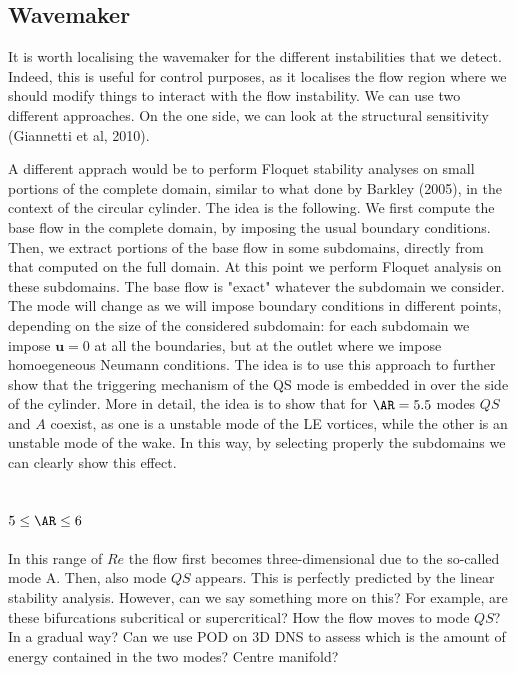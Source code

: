 \documentclass[onecolumn,notitlepage,superscriptaddress, amsmath,amssymb,longbibliographyaps,floatfix]{revtex4-1}
\begin{document}
\subsection{Wavemaker}

It is worth localising the wavemaker for the different instabilities that we detect. Indeed, this is useful for control purposes, as it localises the flow region where we should modify things to interact with the flow instability. We can use two different approaches. On the one side, we can look at the structural sensitivity (Giannetti et al, 2010). 

A different apprach would be to perform Floquet stability analyses on small portions of the complete domain, similar to what done by Barkley (2005), in the context of the circular cylinder. The idea is the following. We first compute the base flow in the complete domain, by imposing the usual boundary conditions. Then, we extract portions of the base flow in some subdomains, directly from that computed on the full domain. At this point we perform Floquet analysis on these subdomains. The base flow is "exact" whatever the subdomain we consider. The mode will change as we will impose boundary conditions in different points, depending on the size of the considered subdomain: for each subdomain we impose $\bm{u}=0$ at all the boundaries, but at the outlet where we impose homoegeneous Neumann conditions. The idea is to use this approach to further show that the triggering mechanism of the QS mode is embedded in over the side of the cylinder. More in detail, the idea is to show that for $\AR=5.5$ modes $QS$ and $A$ coexist, as one is a unstable mode of the LE vortices, while the other is an unstable mode of the wake. In this way, by selecting properly the subdomains we can clearly show this effect.


\subsection{$5 \le \AR \le 6$}

In this range of $Re$ the flow first becomes three-dimensional due to the so-called mode A. Then, also mode $QS$ appears. This is perfectly predicted by the linear stability analysis. However, can we say something more on this? For example, are these bifurcations subcritical or supercritical? How the flow moves to mode $QS$? In a gradual way? Can we use POD on 3D DNS to assess which is the amount of energy contained in the two modes? Centre manifold?
\end{document}
